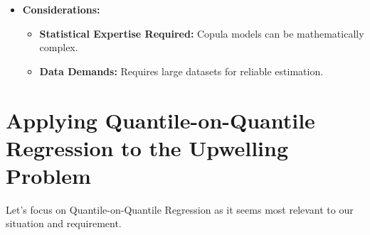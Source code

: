 \documentclass[
  letterpaper,
]{book}
\providecommand{\tightlist}{%
  \setlength{\itemsep}{0pt}\setlength{\parskip}{0pt}}\usepackage{longtable,booktabs,array}
\begin{document}
\begin{enumerate}
\begin{itemize}
    \begin{itemize}
    \tightlist
    \item
      Captures complex dependence structures.
    \item
      Particularly useful for modelling tail dependencies.
    \end{itemize}
  \item
    \textbf{Considerations:}

    \begin{itemize}
    \tightlist
    \item
      \textbf{Statistical Expertise Required:} Copula models can be
      mathematically complex.
    \item
      \textbf{Data Demands:} Requires large datasets for reliable
      estimation.
    \end{itemize}
  \end{itemize}
\end{enumerate}

\section{Applying Quantile-on-Quantile Regression to the Upwelling
Problem}\label{applying-quantile-on-quantile-regression-to-the-upwelling-problem}

Let's focus on Quantile-on-Quantile Regression as it seems most relevant
to our situation and requirement.
\end{document}
